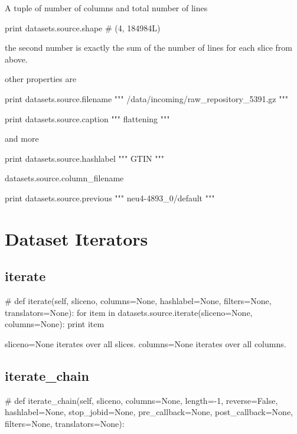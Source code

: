 A tuple of number of columns and total number of lines

\begin{python}
  print datasets.source.shape
  # (4, 184984L)
\end{python}
the second number is exactly the sum of the number of lines for each
slice from above.

other properties are

\begin{python}
  print datasets.source.filename
  """
/data/incoming/raw_repository_5391.gz
"""
\end{python}

\begin{python}
  print datasets.source.caption
  """
flattening
"""
\end{python}


and more

\begin{python}
  print datasets.source.hashlabel
  """
GTIN
"""
\end{python}
\begin{python}
datasets.source.column\_filename
\end{python}

\begin{python}
  print datasets.source.previous
  """
neu4-4893_0/default
"""
\end{python}




\section{Dataset Iterators}

\subsection{iterate}
\begin{python}
# def iterate(self, sliceno, columns=None, hashlabel=None, filters=None, translators=None):
  for item in datasets.source.iterate(sliceno=None, columns=None):
    print item
\end{python}
sliceno=None iterates over all slices.
columns=None iterates over all columns.

\subsection{iterate\_chain}
\begin{python}
# def iterate_chain(self, sliceno, columns=None, length=-1, reverse=False, hashlabel=None, stop_jobid=None, pre_callback=None, post_callback=None, filters=None, translators=None):
\end{python}



